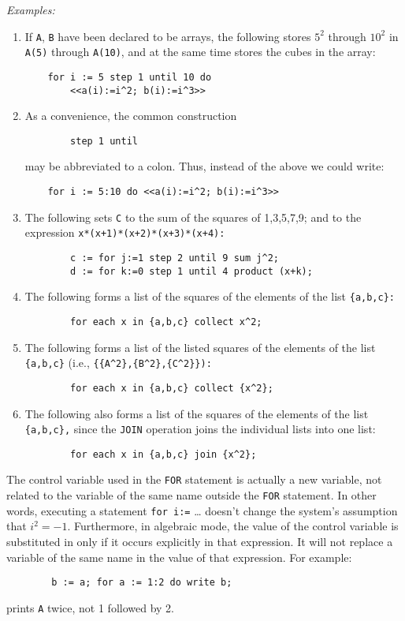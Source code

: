 \textit{Examples:}
\begin{enumerate}
\item If \texttt{A}, \texttt{B} have been declared to be arrays, the following
stores $5^{2}$ through $10^{2}$ in \texttt{A(5)} through \texttt{A(10)}, and at
the same time stores the cubes in the  array:
\begin{verbatim}
    for i := 5 step 1 until 10 do 
        <<a(i):=i^2; b(i):=i^3>>
\end{verbatim}
\item As a convenience, the common construction
\begin{verbatim}
        step 1 until
\end{verbatim}
may be abbreviated to a colon. Thus, instead of the above we could write:
\begin{verbatim}
    for i := 5:10 do <<a(i):=i^2; b(i):=i^3>>
\end{verbatim}
\item The following sets \texttt{C} to the sum of the squares of 1,3,5,7,9;
and  to the expression \texttt{x*(x+1)*(x+2)*(x+3)*(x+4):}
\begin{verbatim}
        c := for j:=1 step 2 until 9 sum j^2;
        d := for k:=0 step 1 until 4 product (x+k);
\end{verbatim}
\item The following forms a list of the squares of the elements of the list
\texttt{\{a,b,c\}:}
\begin{verbatim}
        for each x in {a,b,c} collect x^2;
\end{verbatim}
\item The following forms a list of the listed squares of the elements of the
list \texttt{\{a,b,c\}}
(i.e., \texttt{\{\{A\textasciicircum 2\},\{B\textasciicircum 2\},\{C\textasciicircum 2\}\}):}
\begin{verbatim}
        for each x in {a,b,c} collect {x^2};
\end{verbatim}
\item The following also forms a list of the squares of the elements of
the list \texttt{\{a,b,c\},} since the \texttt{JOIN} operation joins the
individual lists into one list:
\begin{verbatim}
        for each x in {a,b,c} join {x^2};
\end{verbatim}
\end{enumerate}
The control variable used in the \texttt{FOR} statement is actually a new
variable, not related to the variable of the same name outside the 
\texttt{FOR} statement.  In other words, executing a statement 
\texttt{for i:=} \ldots
doesn't change the system's assumption that $i^{2} = -1$.
Furthermore, in algebraic mode, the value of the control variable is
substituted in  only if it occurs explicitly in that
expression.  It will not replace a variable of the same name in the value
of that expression.  For example:
\begin{verbatim}
        b := a; for a := 1:2 do write b;
\end{verbatim}
prints \texttt{A} twice, not 1 followed by 2.

